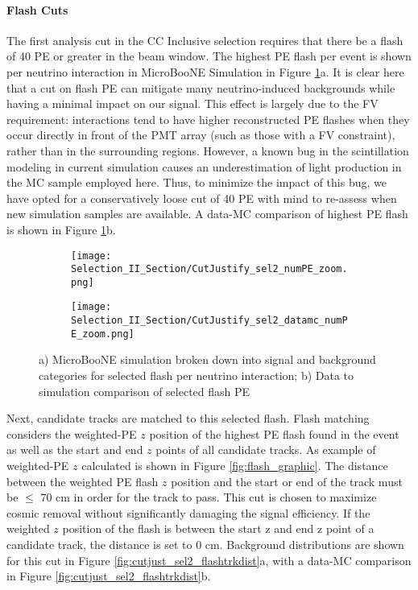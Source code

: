 \paragraph{Flash Cuts}
The first analysis cut in the CC Inclusive selection requires that there be a flash of 40 PE or greater in the beam window. The highest PE flash per event is shown per neutrino interaction in MicroBooNE Simulation in Figure \ref{fig:cutjust_sel2_numPE}a. It is clear here that a cut on flash PE can mitigate many neutrino-induced backgrounds while having a minimal impact on our signal.  This effect is largely due to the FV requirement: interactions tend to have higher reconstructed PE flashes when they occur directly in front of the PMT array (such as those with a FV constraint), rather than in the surrounding regions. However, a known bug in the scintillation modeling in current simulation causes an underestimation of light production in the MC sample employed here.  Thus, to minimize the impact of this bug, we have opted for a conservatively loose cut of 40 PE with mind to re-assess when new simulation samples are available.  A data-MC comparison of highest PE flash is shown in Figure \ref{fig:cutjust_sel2_numPE}b.


\begin{figure}[H]
  \begin{subfigure}[t]{0.4\textwidth}
    \texttt{[image: Selection\_II\_Section/CutJustify\_sel2\_numPE\_zoom.png]}
    \caption{ }
  \end{subfigure}
    \hspace{10 mm}
   \begin{subfigure}[t]{0.4\textwidth}
    \texttt{[image: Selection\_II\_Section/CutJustify\_sel2\_datamc\_numPE\_zoom.png]}
    \caption{ }
  \end{subfigure}
\caption{a) MicroBooNE simulation broken down into signal and background categories for selected flash per neutrino interaction; b) Data to simulation comparison of selected flash PE  }
\label{fig:cutjust_sel2_numPE}
\end{figure}


\par Next, candidate tracks are matched to this selected flash.  Flash matching considers the weighted-PE $z$ position of the highest PE flash found in the event as well as the start and end $z$ points of all candidate tracks. As example of weighted-PE $z$ calculated is shown in Figure \ref{fig:flash_graphic}.  The distance between the weighted PE flash $z$ position and the start or end of the track must be $\leq$ 70 cm in order for the track to pass. This cut is chosen to maximize cosmic removal without significantly damaging the signal efficiency. If the weighted $z$ position of the flash is between the start z and end z point of a candidate track, the distance is set to 0 cm.  Background distributions are shown for this cut in Figure \ref{fig:cutjust_sel2_flashtrkdist}a, with a data-MC comparison in Figure \ref{fig:cutjust_sel2_flashtrkdist}b. 

